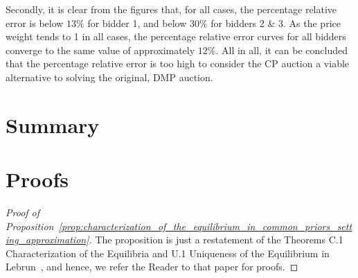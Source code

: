 Secondly, it is clear from the figures that, for all cases, the percentage relative error is below $13\%$ for bidder 1, and below $30\%$ for bidders 2 \& 3. As the price weight tends to 1 in all cases, the percentage relative error curves for all bidders converge to the same value of approximately $12\%$. All in all, it can be concluded that the percentage relative error is too high to consider the CP auction a viable alternative to solving the original, DMP auction.

\section{Summary} %
\label{sec:summary_approximation}


\section{Proofs} %
\label{sec:proofs_approximation}
\begin{proof}[Proof of Proposition~\ref{prop:characterization_of_the_equilibrium_in_common_priors_setting_approximation}]
The proposition is just a restatement of the Theorems C.1 Characterization of the Equilibria and U.1 Uniqueness of the Equilibrium in Lebrun~\cite{Lebrun2006}, and hence, we refer the Reader to that paper for proofs.
\end{proof}
